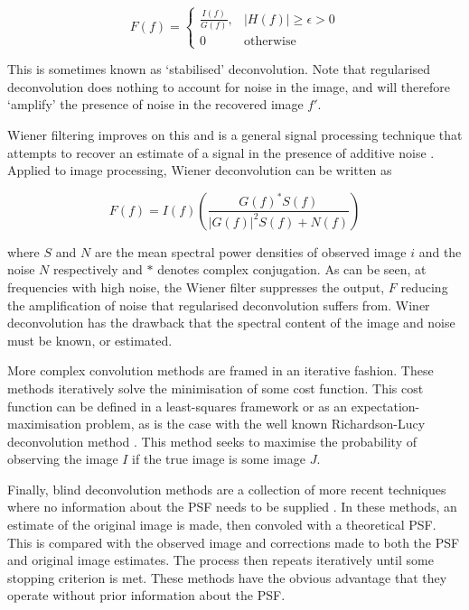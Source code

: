 \begin{equation}
\label{eq:regularised_deconvolution}
F(f) = \begin{cases}
	\frac{I(f)}{G(f)},	& \left| H(f) \right| \ge \epsilon> 0 \\
	0					& \text{otherwise}
\end{cases}
\end{equation}

This is sometimes known as \enquote*{stabilised} deconvolution.
Note that regularised deconvolution does nothing to account for noise in the image, and will therefore \enquote*{amplify} the presence of noise in the recovered image $f'$.

Wiener filtering improves on this and is a general signal processing technique that attempts to recover an estimate of a signal in the presence of additive noise \cite{wiener1964extrapolation}.
Applied to image processing, Wiener deconvolution can be written as

\begin{equation}
\label{eq:wiener_filter}
F(f) = I(f) \left( \frac{G(f)^* S(f)}{\left| G(f) \right|^2 S(f) + N(f) } \right)
\end{equation}

where $S$ and $N$ are the mean spectral power densities of observed image $i$ and the noise $N$ respectively and $*$ denotes complex conjugation.
As can be seen, at frequencies with high noise, the Wiener filter suppresses the output, $F$ reducing the amplification of noise that regularised deconvolution suffers from.
Winer deconvolution has the drawback that the spectral content of the image and noise must be known, or estimated.

More complex convolution methods are framed in an iterative fashion.
These methods iteratively solve the minimisation of some cost function.
This cost function can be defined in a least-squares framework \cite{ng99anew} or as an expectation-maximisation problem, as is the case with the well known Richardson-Lucy deconvolution method \cite{richarson1972bayesian}.
This method seeks to maximise the probability of observing the image $I$ if the true image is some image $J$.

Finally, blind deconvolution methods are a collection of more recent techniques where no information about the PSF needs to be supplied \cite{bell1995information, ayers1988iterative}.
In these methods, an estimate of the original image is made, then convoled with a theoretical PSF.
This is compared with the observed image and corrections made to both the PSF and original image estimates.
The process then repeats iteratively until some stopping criterion is met.
These methods have the obvious advantage that they operate without prior information about the PSF.

